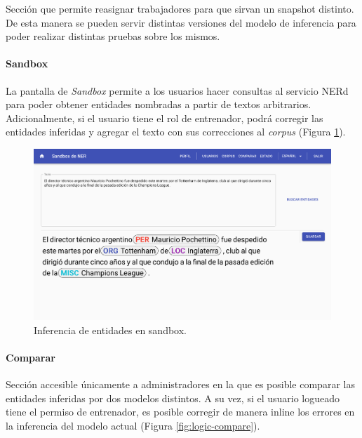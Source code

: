 \documentclass[12pt,a4paper,]{scrartcl}
\let\oldparagraph\paragraph
\renewcommand{\paragraph}[1]{\oldparagraph{#1}\mbox{}}
\begin{document}
Sección que permite reasignar trabajadores para que sirvan un snapshot distinto. De esta manera se pueden servir distintas versiones del modelo de inferencia para poder realizar distintas pruebas sobre los mismos.

\hypertarget{sandbox}{%
\paragraph{Sandbox}\label{sandbox}}

La pantalla de \emph{Sandbox} permite a los usuarios hacer consultas al servicio NERd para poder obtener entidades nombradas a partir de textos arbitrarios.
Adicionalmente, si el usuario tiene el rol de entrenador, podrá corregir las entidades inferidas y agregar el texto con sus correcciones al \emph{corpus} (Figura \ref{fig:logic-sandbox}).

\begin{figure}[H]

{\centering \includegraphics{assets/logic/sandbox.pdf} 

}

\caption{Inferencia de entidades en sandbox.}\label{fig:logic-sandbox}
\end{figure}

\hypertarget{comparar}{%
\paragraph{Comparar}\label{comparar}}

Sección accesible únicamente a administradores en la que es posible comparar las entidades inferidas por dos modelos distintos. A su vez, si el usuario logueado tiene el permiso de entrenador, es posible corregir de manera inline los errores en la inferencia del modelo actual (Figura \ref{fig:logic-compare}).
\end{document}

